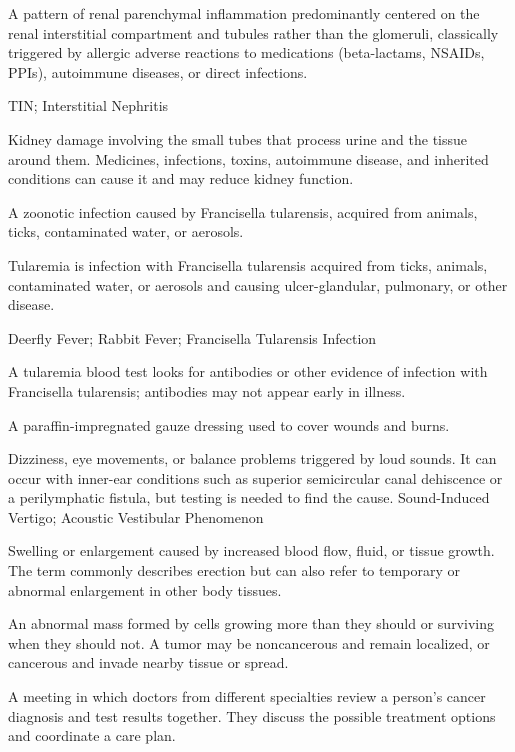  A pattern of renal parenchymal inflammation predominantly centered on the renal interstitial compartment and tubules rather than the glomeruli, classically triggered by allergic adverse reactions to medications (beta-lactams, NSAIDs, PPIs), autoimmune diseases, or direct infections.

\synonyms
TIN; Interstitial Nephritis

 Kidney damage involving the small tubes that process urine and the tissue around them. Medicines, infections, toxins, autoimmune disease, and inherited conditions can cause it and may reduce kidney function.

 A zoonotic infection caused by Francisella tularensis, acquired from animals, ticks, contaminated water, or aerosols.

 Tularemia is infection with Francisella tularensis acquired from ticks, animals, contaminated water, or aerosols and causing ulcer-glandular, pulmonary, or other disease.

\synonyms
Deerfly Fever; Rabbit Fever; Francisella Tularensis Infection

 A tularemia blood test looks for antibodies or other evidence of infection with Francisella tularensis; antibodies may not appear early in illness.

 A paraffin-impregnated gauze dressing used to cover wounds and burns.

 Dizziness, eye movements, or balance problems triggered by loud sounds. It can occur with inner-ear conditions such as superior semicircular canal dehiscence or a perilymphatic fistula, but testing is needed to find the cause.
\synonyms
Sound-Induced Vertigo; Acoustic Vestibular Phenomenon

 Swelling or enlargement caused by increased blood flow, fluid, or tissue growth. The term commonly describes erection but can also refer to temporary or abnormal enlargement in other body tissues.

 An abnormal mass formed by cells growing more than they should or surviving when they should not. A tumor may be noncancerous and remain localized, or cancerous and invade nearby tissue or spread.

 A meeting in which doctors from different specialties review a person’s cancer diagnosis and test results together. They discuss the possible treatment options and coordinate a care plan.

